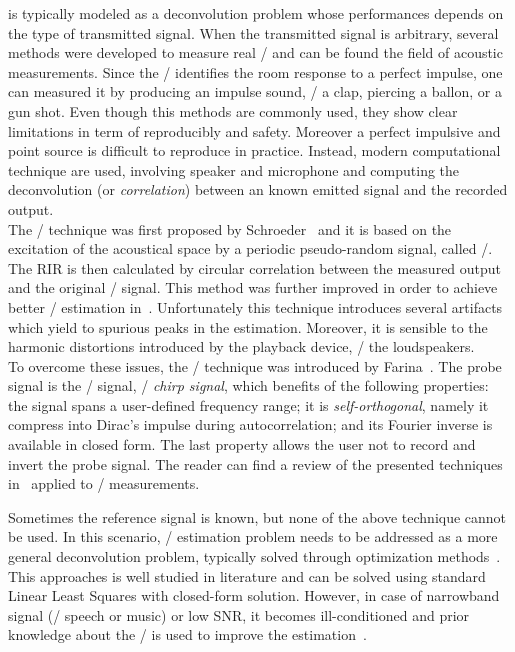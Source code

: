  is typically modeled as a deconvolution problem whose performances depends on the type of transmitted signal.
When the transmitted signal is arbitrary, several methods were developed to measure real \RIRs/ and can be found the field of acoustic measurements.
Since the \RIR/ identifies the room response to a perfect impulse, one can measured it by producing an impulse sound, \eg/ a clap, piercing a ballon, or a gun shot.
Even though this methods are commonly used, they show clear limitations in term of reproducibly and safety.
Moreover a perfect impulsive and point source is difficult to reproduce in practice.
Instead, modern computational technique are used, involving speaker and microphone and computing the deconvolution (or \textit{correlation}) between an known emitted signal and the recorded output.
\\The \MLSdef/ technique was first proposed by Schroeder~ and it is based on the excitation of the acoustical space by a periodic pseudo-random signal, called \MLS/.
The RIR is then calculated by circular correlation between the measured output and the original \MLS/ signal.
This method was further improved in order to achieve better \RIR/ estimation in~.
Unfortunately this technique introduces several artifacts which yield to spurious peaks in the estimation.
Moreover, it is sensible to the harmonic distortions introduced by the playback device, \eg/ the loudspeakers.
\\To overcome these issues, the \ESSdef/ technique was introduced by Farina~.
The probe signal is the \ESS/ signal, \aka/ \textit{chirp signal}, which benefits of the following properties:
the signal spans a user-defined frequency range; it is \textit{self-orthogonal}, namely it compress into Dirac's impulse during autocorrelation; and its Fourier inverse is available in closed form.
The last property allows the user not to record and invert the probe signal.
The reader can find a review of the presented techniques in~ applied to \RIR/ measurements.

\mynewline
Sometimes the reference signal is known, but none of the above technique cannot be used.
In this scenario, \RIR/ estimation problem needs to be addressed as a more general deconvolution problem, typically solved through optimization methods~.
This approaches is well studied in literature and can be solved using standard Linear Least Squares with closed-form solution.
However, in case of narrowband signal (\eg/ speech or music) or low SNR, it becomes ill-conditioned and prior knowledge about the \RIR/ is used to improve the estimation~.

